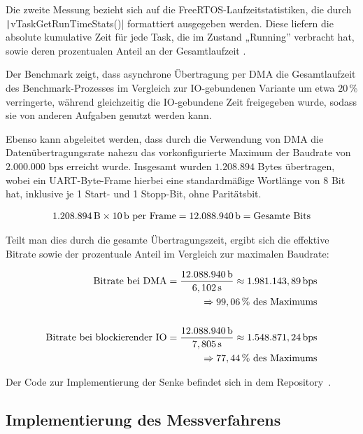 Die zweite Messung bezieht sich auf die FreeRTOS-Laufzeitstatistiken, die durch
\linebreak \texttt|vTaskGetRunTimeStats()| formattiert ausgegeben
werden. Diese liefern die absolute kumulative Zeit für jede Task, die im Zustand
„Running” verbracht hat, sowie deren prozentualen Anteil an der Gesamtlaufzeit
\cite{freertos_runtime_stats}.

Der Benchmark zeigt, dass asynchrone Übertragung per DMA die Gesamtlaufzeit des
Benchmark-Prozesses im Vergleich zur IO-gebundenen Variante um etwa $20\,\%$
verringerte, während gleichzeitig die IO-gebundene Zeit freigegeben wurde,
sodass sie von anderen Aufgaben genutzt werden kann.

Ebenso kann abgeleitet werden, dass durch die Verwendung von DMA die
Datenübertragungsrate nahezu das vorkonfigurierte Maximum der Baudrate von
$2.000.000\text{ bps}$ erreicht wurde. Insgesamt wurden $1.208.894$ Bytes
übertragen, wobei ein UART-Byte-Frame hierbei eine standardmäßige Wortlänge von
8 Bit hat, inklusive je 1 Start- und 1 Stopp-Bit, ohne Paritätsbit.

\begin{align*}
    1.208.894\text{\,B} \times 10\text{\,b per Frame} =
    12.088.940 \text{\,b} = \text{Gesamte Bits}
\end{align*}

Teilt man dies durch die gesamte Übertragungszeit, ergibt sich die effektive
Bitrate sowie der prozentuale Anteil im Vergleich zur maximalen Baudrate:

\begin{align*}
    \text{Bitrate bei DMA} =
    \frac{12.088.940\text{\,b}}{6,102\text{\,s}} \approx
    1.981.143,89 \text{\,bps} \\
    \quad \Rightarrow 99,06\,\%\text{ des Maximums} \\
    \\
    \text{Bitrate bei blockierender IO} =
    \frac{12.088.940\text{\,b}}{7,805\text{\,s}} \approx
    1.548.871,24 \text{\,bps} \\
    \quad \Rightarrow 77,44\,\% \text{ des Maximums}
\end{align*}

Der Code zur Implementierung der Senke befindet sich in dem
Repository~\cite{freertos_threadsafe_sink}.

\subsection{Implementierung des Messverfahrens}

